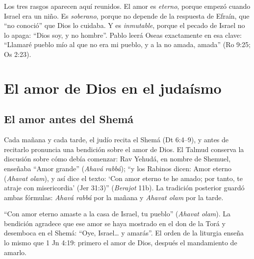 Los tres rasgos aparecen aquí reunidos. El amor es \emph{eterno}, porque empezó cuando Israel era un niño. Es \emph{soberano}, porque no depende de la respuesta de Efraín, que ``no conoció'' que Dios lo cuidaba. Y es \emph{inmutable}, porque el pecado de Israel no lo apaga: ``Dios soy, y no hombre''. Pablo leerá Oseas exactamente en esa clave: ``Llamaré pueblo mío al que no era mi pueblo, y a la no amada, amada'' (Ro 9:25; Os 2:23).

\section{El amor de Dios en el judaísmo}\label{sec:judaismo-amor}


\subsection{El amor antes del Shemá}
Cada mañana y cada tarde, el judío recita el Shemá (Dt 6:4--9), y antes de recitarlo pronuncia una bendición sobre el amor de Dios. El Talmud conserva la discusión sobre cómo debía comenzar: Rav Yehudá, en nombre de Shemuel, enseñaba ``Amor grande'' (\emph{Ahavá rabbá}); ``y los Rabinos dicen: Amor eterno (\emph{Ahavat olam}), y así dice el texto: `Con amor eterno te he amado; por tanto, te atraje con misericordia' (Jer 31:3)'' (\emph{Berajot} 11b). La tradición posterior guardó ambas fórmulas: \emph{Ahavá rabbá} por la mañana y \emph{Ahavat olam} por la tarde.


``Con amor eterno amaste a la casa de Israel, tu pueblo'' (\emph{Ahavat olam}). La bendición agradece que ese amor se haya mostrado en el don de la Torá y desemboca en el Shemá: ``Oye, Israel\ldots{} y amarás''. El orden de la liturgia enseña lo mismo que 1 Jn 4:19: primero el amor de Dios, después el mandamiento de amarlo.



